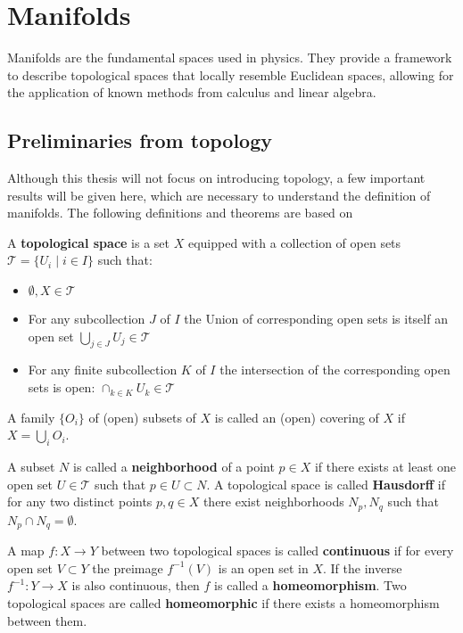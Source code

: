 \chapter{Manifolds}

Manifolds are the fundamental spaces used in physics. They provide a framework to describe topological spaces that locally resemble Euclidean spaces, allowing for the application of known methods from calculus and linear algebra.

\section{Preliminaries from topology}

Although this thesis will not focus on introducing topology, a few important results will be given here, which are necessary to understand the definition of manifolds. The following definitions and theorems are based on \cite{NakaharaGeometrytopologyphysics2005}

A \textbf{topological space} is a set \( X \) equipped with a collection of open sets \( \mathcal{T} = \{ U_i \mid i\in I\} \) such that:
\begin{itemize}
    \item \( \emptyset, X \in \mathcal{T} \)
    \item For any subcollection $J$ of $I$ the Union of corresponding open sets is itself an open set \( \bigcup_{j\in J} U_j \in \mathcal{T} \)
    \item For any finite subcollection $K$ of $I$ the intersection of the corresponding open sets is open: \( \cap_{k \in K} U_k \in \mathcal{T} \)
\end{itemize}

A family $\{O_i\}$ of (open) subsets of $X$ is called an (open) covering of $X$ if \( X = \bigcup_i O_i \).

A subset $N$ is called a \textbf{neighborhood} of a point \( p \in X \) if there exists at least one open set \( U \in \mathcal{T} \) such that \( p \in U \subset N \). A topological space is called \textbf{Hausdorff} if for any two distinct points \( p, q \in X \) there exist neighborhoods \( N_p, N_q \) such that \( N_p \cap N_q = \emptyset \).

A map \( f: X \to Y \) between two topological spaces is called \textbf{continuous} if for every open set \( V \subset Y \) the preimage \( f^{-1}(V) \) is an open set in \( X \). If the inverse \( f^{-1} : Y \to X \) is also continuous, then \( f \) is called a \textbf{homeomorphism}. Two topological spaces are called \textbf{homeomorphic} if there exists a homeomorphism between them.

